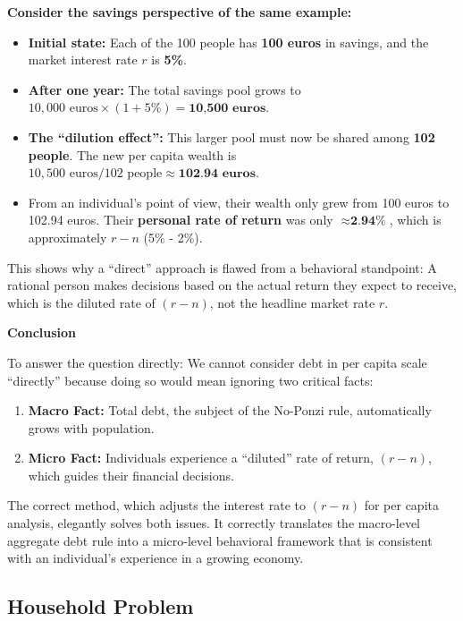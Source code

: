 \begin{remark*}[$e^{-\bar{r}_t t} A_t =  e^{-(\bar{r}_t - n)t} a_t\geq 0$ or $e^{-\bar{r}_tt}a_t \geq 0$? \textbf{Why we cannot consider debt in per capita scale directly?}]
    \textbf{Consider the savings perspective of the same example:}
    \begin{itemize}
        \item \textbf{Initial state:} Each of the 100 people has \textbf{100 euros} in savings, and the market interest rate $r$ is \textbf{5\%}.
        \item \textbf{After one year:} The total savings pool grows to $10,000 \text{ euros} \times (1 + 5\%) = \textbf{10,500 euros}$.
        \item \textbf{The ``dilution effect'':} This larger pool must now be shared among \textbf{102 people}. The new per capita wealth is $10,500 \text{ euros} / 102 \text{ people} \approx \textbf{102.94 euros}$.
        \item From an individual's point of view, their wealth only grew from 100 euros to 102.94 euros. Their \textbf{personal rate of return} was only $\approx \textbf{2.94\%}$, which is approximately $r - n$ (5\% - 2\%).
    \end{itemize}
    This shows why a ``direct'' approach is flawed from a behavioral standpoint: A rational person makes decisions based on the actual return they expect to receive, which is the diluted rate of $(r-n)$, not the headline market rate $r$.

    \textbf{Conclusion}

    To answer the question directly: We cannot consider debt in per capita scale ``directly'' because doing so would mean ignoring two critical facts:
    \begin{enumerate}
        \item \textbf{Macro Fact:} Total debt, the subject of the No-Ponzi rule, automatically grows with population.
        \item \textbf{Micro Fact:} Individuals experience a ``diluted'' rate of return, $(r-n)$, which guides their financial decisions.
    \end{enumerate}
    The correct method, which adjusts the interest rate to $(r-n)$ for per capita analysis, elegantly solves both issues. It correctly translates the macro-level aggregate debt rule into a micro-level behavioral framework that is consistent with an individual's experience in a growing economy.
\end{remark*}

\subsection{Household Problem}

